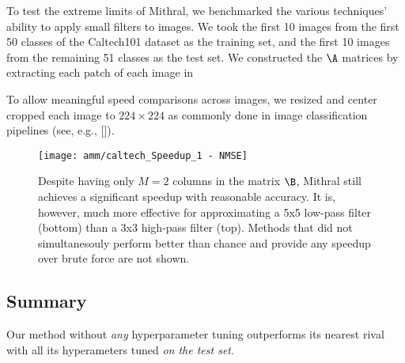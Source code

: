 To test the extreme limits of Mithral, we benchmarked the various techniques' ability to apply small filters to images. We took the first 10 images from the first 50 classes of the Caltech101 dataset as the training set, and the first 10 images from the remaining 51 classes as the test set. We constructed the $\A$ matrices by extracting each patch of each image in

To allow meaningful speed comparisons across images, we resized and center cropped each image to $224 \times 224$ as commonly done in image classification pipelines (see, e.g., []).



\begin{figure}[h]
\begin{center}
\texttt{[image: amm/caltech\_Speedup\_1 - NMSE]}
\caption{Despite having only $M=2$ columns in the matrix $\B$, Mithral still achieves a significant speedup with reasonable accuracy. It is, however, much more effective for approximating a 5x5 low-pass filter (bottom) than a 3x3 high-pass filter (top). Methods that did not simultanesouly perform better than chance and provide any speedup over brute force are not shown.}
\label{fig:caltech}
\end{center}
\end{figure}

\subsection{Summary}

Our method without \textit{any} hyperparameter tuning outperforms its nearest rival with all its hyperameters tuned \textit{on the test set}.
